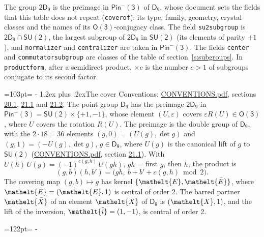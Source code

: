 \documentclass[10pt,a4paper]{article}
\makeatletter
\renewcommand\section{\@startsection{section}{1}{\z@}{-3ex plus -1ex minus -.2ex}%
  {1.2ex plus .2ex}{\normalfont\large\sffamily\bfseries\color{parttitle}}}
\newcommand{\needspace}[1]{\par\penalty-100\begingroup\dimen0=#1\relax\dimen2=\pagegoal
  \advance\dimen2-\pagetotal\ifdim\dimen0>\dimen2\relax\ifdim\dimen2>0pt\vfil\break\fi\fi
  \endgroup}
\numberwithin{equation}{section}
\newcommand{\eltfont}[1]{{\let\sigma\eltsigma\mathelt{#1}}}
\newcommand{\grp}[1]{\mathsf{#1}}
\newcommand{\elt}[1]{\eltfont{#1}}
\newcommand{\dirprod}{\times}
\newcommand{\barred}[1]{\bar{#1}}
\newcommand{\lift}[1]{\tilde{#1}}
\makeatother
\begin{document}
\leavevmode\label{n:element.inversion}\label{n:group.preimage}The group $\grp{2D_{9}}$ is the preimage in $\grp{Pin^{-}(3)}$ of \href{../../../rotation/data/pdf/D9.pdf}{$\grp{D_{9}}$}, whose document sets the fields that this table does not repeat (\texttt{coverof}): its type, family, geometry, crystal classes and the names of its \href{../../../rotation/data/pdf/O3.pdf}{$\grp{O(3)}$}-conjugacy class. The field \texttt{su2subgroup} is $\grp{2D_{9}} \cap \grp{SU(2)}$, the largest subgroup of $\grp{2D_{9}}$ in $\grp{SU(2)}$ (its elements of parity $+1$), and \texttt{normalizer} and \texttt{centralizer} are taken in $\grp{Pin^{-}(3)}$. The fields \texttt{center} and \texttt{commutatorsubgroup} are classes of the table of section~\ref{s:subgroups}.
\leavevmode\label{n:index.conjugates.c}In \texttt{productform}, after a semidirect product, ${\times}c$ is the number $c > 1$ of subgroups conjugate to its second factor.
\needspace{103pt}
\section{The cover}\label{s:cover}
Conventions: \href{../../CONVENTIONS.pdf}{CONVENTIONS.pdf}, sections \href{../../CONVENTIONS.pdf\#conv.20.1}{20.1}, \href{../../CONVENTIONS.pdf\#conv.21.1}{21.1} and \href{../../CONVENTIONS.pdf\#conv.21.2}{21.2}.
\leavevmode\label{n:group.pin.minus}\label{n:group.su2}\label{n:local.pin.sign}\label{n:matrix.covered}\label{n:matrix.lift.su2}\label{n:index.bar}The point group $\grp{D_{9}}$ has the preimage $\grp{2D_{9}}$ in $\grp{Pin^{-}(3)} = \grp{SU(2)} \dirprod \{+1, -1\}$, whose element $(U, \varepsilon)$ covers $\varepsilon R(U) \in \grp{O(3)}$, where $U$ covers the rotation $R(U)$. The preimage is the double group of $\grp{D_{9}}$, with the $2 \cdot 18 = 36$ elements $(g, 0) = (U(g), \det g)$ and $(g, 1) = (-U(g), \det g)$, $g \in \grp{D_{9}}$, where $U(g)$ is the canonical lift of $g$ to $\grp{SU(2)}$ (\href{../../CONVENTIONS.pdf}{CONVENTIONS.pdf}, section \href{../../CONVENTIONS.pdf\#conv.21.1}{21.1}). \label{n:function.cocycle}With $U(h)\,U(g) = (-1)^{c(g,h)}\,U(gh)$, $gh$ = first $g$, then $h$, the product is
\begin{equation}\label{e:product}(g, b)(h, b') = \bigl(gh,\ b + b' + c(g, h) \bmod 2\bigr).\end{equation}
\leavevmode\label{n:mark.bar}The covering map $(g, b) \mapsto g$ has kernel $\{\elt{E}, \elt{\barred{E}}\}$, where $\elt{\barred{E}} = (\elt{E}, 1)$ is central of order 2. \label{n:element.named}\label{n:mark.lift}The barred partner $\elt{\barred{X}}$ of an element $\elt{X}$ of $\grp{D_{9}}$ is $(\elt{X}, 1)$, and the lift of the inversion, $\elt{\lift{i}} = (1, -1)$, is central of order 2.
\needspace{122pt}
\end{document}
